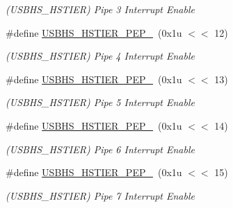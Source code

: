 \begin{DoxyCompactItemize}
\begin{DoxyCompactList}\small\item\em (U\+S\+B\+H\+S\+\_\+\+H\+S\+T\+I\+ER) Pipe 3 Interrupt Enable \end{DoxyCompactList}\item 
\mbox{\label{group__SAME70__USBHS_ga6c132fc69c3337e6671990fd1a7e991a}} 
\#define \mbox{\hyperlink{group__SAME70__USBHS_ga6c132fc69c3337e6671990fd1a7e991a}{U\+S\+B\+H\+S\+\_\+\+H\+S\+T\+I\+E\+R\+\_\+\+P\+E\+P\+\_}}~(0x1u $<$$<$ 12)
\begin{DoxyCompactList}\small\item\em (U\+S\+B\+H\+S\+\_\+\+H\+S\+T\+I\+ER) Pipe 4 Interrupt Enable \end{DoxyCompactList}\item 
\mbox{\label{group__SAME70__USBHS_ga6b87a486fa83e0611c5a4eb9d501f7b3}} 
\#define \mbox{\hyperlink{group__SAME70__USBHS_ga6b87a486fa83e0611c5a4eb9d501f7b3}{U\+S\+B\+H\+S\+\_\+\+H\+S\+T\+I\+E\+R\+\_\+\+P\+E\+P\+\_}}~(0x1u $<$$<$ 13)
\begin{DoxyCompactList}\small\item\em (U\+S\+B\+H\+S\+\_\+\+H\+S\+T\+I\+ER) Pipe 5 Interrupt Enable \end{DoxyCompactList}\item 
\mbox{\label{group__SAME70__USBHS_ga5e1680335266b023196d8eec97400876}} 
\#define \mbox{\hyperlink{group__SAME70__USBHS_ga5e1680335266b023196d8eec97400876}{U\+S\+B\+H\+S\+\_\+\+H\+S\+T\+I\+E\+R\+\_\+\+P\+E\+P\+\_}}~(0x1u $<$$<$ 14)
\begin{DoxyCompactList}\small\item\em (U\+S\+B\+H\+S\+\_\+\+H\+S\+T\+I\+ER) Pipe 6 Interrupt Enable \end{DoxyCompactList}\item 
\mbox{\label{group__SAME70__USBHS_ga788ce64d2afdf12459e1d2ae8899323d}} 
\#define \mbox{\hyperlink{group__SAME70__USBHS_ga788ce64d2afdf12459e1d2ae8899323d}{U\+S\+B\+H\+S\+\_\+\+H\+S\+T\+I\+E\+R\+\_\+\+P\+E\+P\+\_}}~(0x1u $<$$<$ 15)
\begin{DoxyCompactList}\small\item\em (U\+S\+B\+H\+S\+\_\+\+H\+S\+T\+I\+ER) Pipe 7 Interrupt Enable \end{DoxyCompactList}\item 

\end{DoxyCompactItemize}
